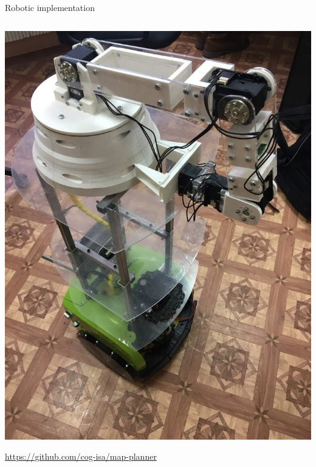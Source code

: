 \documentclass[default]{beamer}
\begin{document}
\begin{frame}{Robotic implementation}
\begin{columns}
\begin{column}{0.4\textwidth}
				\includegraphics[width=\textwidth]{misc/robots/nexus.jpg}
				\par\bigskip
				\url{https://github.com/cog-isa/map-planner}
			\end{column}
		\end{columns}
	\end{frame}
\end{document}

